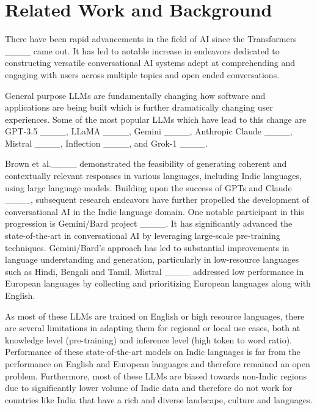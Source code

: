 \section{Related Work and Background}
There have been rapid advancements in the field of AI since the Transformers ____ came out. It has led to notable increase in endeavors dedicated to constructing versatile conversational AI systems adept at comprehending and engaging with users across multiple topics and open ended conversations. 

General purpose LLMs are fundamentally changing how software and applications are being built which is further dramatically changing user experiences. Some of the most popular LLMs which have lead to this change are GPT-3.5 ____, LLaMA ____, Gemini ____, Anthropic Claude ____, Mistral ____, Inflection ____, and Grok-1 ____. 

Brown et al.____ demonstrated the feasibility of generating coherent and contextually relevant responses in various languages, including Indic languages, using large language models.
Building upon the success of GPTs and Claude ____, subsequent research endeavors have further propelled the development of conversational AI in the Indic language domain. One notable participant in this progression is Gemini/Bard project ____. It has significantly advanced the state-of-the-art in conversational AI by leveraging large-scale pre-training techniques. Gemini/Bard's approach has led to substantial improvements in language understanding and generation, particularly in low-resource languages such as Hindi, Bengali and Tamil. Mistral ____ addressed low performance in European languages by collecting and prioritizing European languages along with English.

As most of these LLMs are trained on English or high resource languages, there are several limitations in adapting them for regional or local use cases, both at knowledge level (pre-training) and inference level (high token to word ratio).  Performance of these state-of-the-art models on Indic languages is far from the performance on English and European languages and therefore remained an open problem. Furthermore, most of these LLMs are biased towards non-Indic regions due to significantly lower volume of Indic data and therefore do not work for countries like India that have a rich and diverse landscape, culture and languages. 

